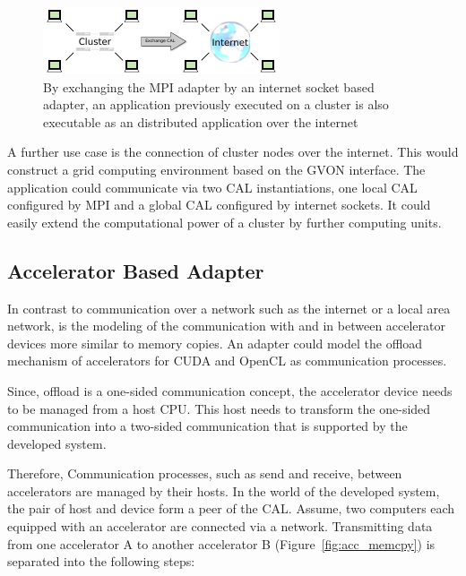 \begin{figure}[H]
  \centering \includegraphics[width=\textwidth]{graphics/60_internet_cal}
  \caption{By exchanging the MPI adapter by an internet socket based
    adapter, an application previously executed on a cluster is also
    executable as an distributed application over the internet}
  \label{fig:internet_cal}
\end{figure}

\noindent A further use case is the connection of cluster nodes over the
internet. This would construct a grid computing environment based
on the GVON interface. The application could communicate via two
CAL instantiations, one local CAL configured by MPI and a global
CAL configured by internet sockets.  It could easily extend the
computational power of a cluster by further computing
units.



\subsection*{Accelerator Based Adapter}

In contrast to communication over a network such as the internet
or a local area network, is the modeling of the communication with
and in between accelerator devices more similar to memory copies.
An adapter could model the offload mechanism of accelerators for
CUDA and OpenCL as communication processes.

Since, offload is a one-sided communication concept, the
accelerator device needs to be managed from a host CPU. This host
needs to transform the one-sided communication into a two-sided
communication that is supported by the developed system.

Therefore, Communication processes, such as send and receive,
between accelerators are managed by their hosts. In the world of the
developed system, the pair of host and device form a peer of the
CAL. Assume, two computers each equipped with an accelerator are
connected via a network. Transmitting data from one accelerator A to
another accelerator B (Figure~\ref{fig:acc_memcpy}) is separated into the following steps:


